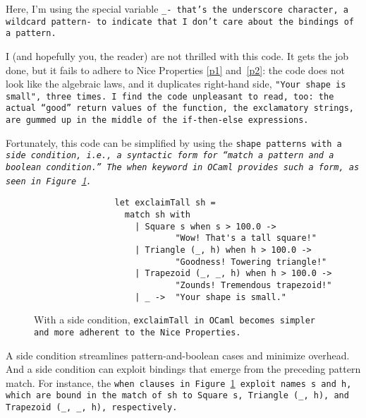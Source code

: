 \documentclass[manuscript,screen,review, 12pt, nonacm]{acmart}
\begin{document}
    Here, I'm using the special variable \tt{\_}- that's the underscore
    character, a wildcard pattern- to indicate that I don't care about the
    bindings of a pattern. 

    I (and hopefully you, the reader) are not thrilled with this code. It gets
    the job done, but it fails to adhere to Nice Properties \ref{p1}
    and~\ref{p2}: the code does not look like the algebraic laws, and it
    duplicates right-hand side, \tt{"Your shape is small"}, three times. I find
    the code unpleasant to read, too: the actual “good” return values of the
    function, the exclamatory strings, are gummed up in the middle of the
    \tt{if-then-else} expressions.
    
    Fortunately, this code can be simplified by using the \tt{shape} patterns
    with a \it{side condition}, i.e., a syntactic form for “match a pattern
    \it{and} a boolean condition.” The \tt{when} keyword in OCaml provides such
    a form, as seen in Figure~\ref{fig:whenexclaimtall}.
        
        \begin{figure}[]
            \begin{verbatim}
                let exclaimTall sh =
                  match sh with 
                    | Square s when s > 100.0 ->
                            "Wow! That's a tall square!"
                    | Triangle (_, h) when h > 100.0 ->
                            "Goodness! Towering triangle!"
                    | Trapezoid (_, _, h) when h > 100.0 -> 
                            "Zounds! Tremendous trapezoid!"
                    | _ ->  "Your shape is small." 
                \end{verbatim}
            \caption{With a side condition, \tt{exclaimTall} in OCaml becomes
            simpler and more adherent to the Nice Properties.} 
            \label{fig:whenexclaimtall}
        \end{figure}

    A side condition streamlines pattern-and-boolean cases and minimize
    overhead. And a side condition can exploit bindings that emerge from the
    preceding pattern match. For instance, the \tt{when} clauses in
    Figure~\ref{fig:whenexclaimtall} exploit names \tt{s} and \tt{h}, which are
    bound in the match of \tt{sh} to \tt{Square s}, \tt{Triangle (\_, h)}, and
    \tt{Trapezoid (\_, \_, h)}, respectively. 
\end{document}
